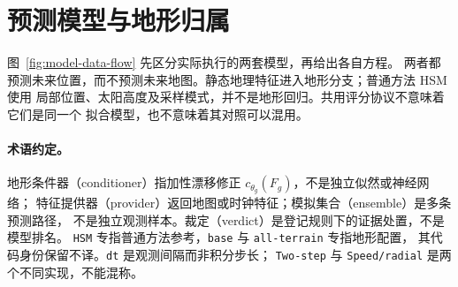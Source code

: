 \section{预测模型与地形归属}
\label{sec:models}\hypertarget{sec:models}{}
图~\ref{fig:model-data-flow} 先区分实际执行的两套模型，再给出各自方程。
两者都预测未来位置，而不预测未来地图。静态地理特征进入地形分支；普通方法 HSM 使用
局部位置、太阳高度及采样模式，并不是地形回归。共用评分协议不意味着它们是同一个
拟合模型，也不意味着其对照可以混用。
\begin{samepage}
\paragraph{术语约定。}
地形条件器（conditioner）指加性漂移修正 \(c_{\theta_g}(F_g)\)，不是独立似然或神经网络；
特征提供器（provider）返回地图或时钟特征；模拟集合（ensemble）是多条预测路径，
不是独立观测样本。裁定（verdict）是登记规则下的证据处置，不是模型排名。
\texttt{HSM} 专指普通方法参考，\texttt{base} 与 \texttt{all-terrain} 专指地形配置，
其代码身份保留不译。\texttt{dt} 是观测间隔而非积分步长；
\texttt{Two-step} 与 \texttt{Speed/radial} 是两个不同实现，不能混称。
\par
\end{samepage}
